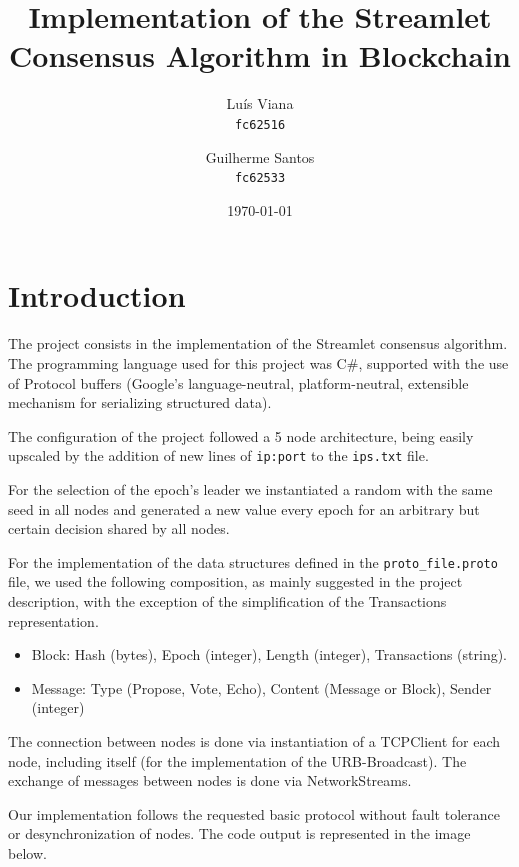 \documentclass[11pt]{report}
\title{Implementation of the Streamlet Consensus Algorithm in Blockchain}
\author{
Luís Viana    \\
\texttt{fc62516}  \and
Guilherme Santos      \\
\texttt{fc62533} 
\date{\today}
}
\begin{document}
\maketitle
{}
\section{Introduction}
The project consists in the implementation of the Streamlet consensus algorithm.  The programming language used for this project was C\#, supported with the use of Protocol buffers (Google's language-neutral, platform-neutral, extensible mechanism for serializing structured data).  

The configuration of the project followed a 5 node architecture, being easily upscaled by the addition of new lines of \texttt{ip:port} to the \texttt{ips.txt} file.  

For the selection of the epoch’s leader we instantiated a random with the same seed in all nodes and generated a new value every epoch for an arbitrary but certain decision shared by all nodes.

For the implementation of the data structures defined in the \texttt{proto\_file.proto} file, we used the following composition, as mainly suggested in the project description, with the exception of the simplification of the Transactions representation.

\begin{itemize}
    \item Block: Hash (bytes), Epoch (integer), Length (integer), Transactions (string).  
    \item Message: Type (Propose, Vote, Echo), Content (Message or Block), Sender (integer)
\end{itemize}

The connection between nodes is done via instantiation of a TCPClient for each node, including itself (for the implementation of the URB-Broadcast). The exchange of messages between nodes is done via NetworkStreams. 

Our implementation follows the requested basic protocol without fault tolerance or desynchronization of nodes. The code output is represented in the image below. 
\end{document}
